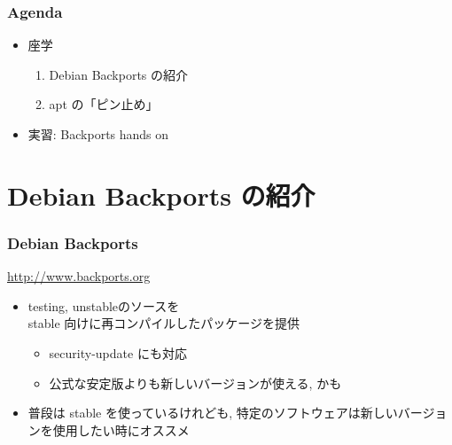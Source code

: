 \documentclass[cjk,dvipdfmx,12pt,%
hyperref={bookmarks=true,bookmarksnumbered=true,bookmarksopen=false,%
colorlinks=false,%
pdftitle={野良ビルドから始めるパッケージ作成},%
pdfauthor={佐々木洋平},%
pdfsubject={第37回関西Debian勉強会 at OSC 2010 Kansai$@$kyoto},%
}]{beamer}
\begin{document}


\begin{frame}[fragile]
\frametitle{Agenda}


\begin{itemize}
\item 座学

\begin{enumerate}
\item Debian Backports の紹介
\item apt の「ピン止め」
\end{enumerate}

\item 実習: Backports hands on
\end{itemize}


\end{frame}

\section{Debian Backports の紹介}




\begin{frame}[fragile]
\frametitle{Debian Backports}


\begin{center}
\underline{\url{http://www.backports.org}}
\end{center}

\begin{itemize}
\item testing, unstableのソースを\\
stable 向けに再コンパイルしたパッケージを提供

\begin{itemize}
\item security-update にも対応

\item 公式な安定版よりも新しいバージョンが使える, かも
\end{itemize}

\item 普段は stable を使っているけれども,
特定のソフトウェアは新しいバージョンを使用したい時にオススメ
\end{itemize}


\end{frame}
\end{document}
